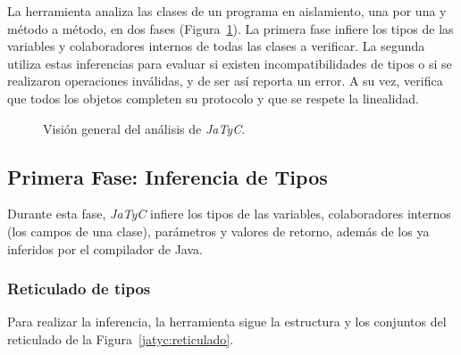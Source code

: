 La herramienta analiza las clases de un programa en aislamiento, una por una y método a método, en dos fases (Figura~\ref{fig:jatyc:pipeline}). La primera fase infiere los tipos de las variables y colaboradores internos de todas las clases a verificar. La segunda utiliza estas inferencias para evaluar si existen incompatibilidades de tipos o si se realizaron operaciones inválidas, y de ser así reporta un error. A su vez, verifica que todos los objetos completen su protocolo y que se respete la linealidad.

\begin{figure}[htbp]
    \centering
    \caption{Visión general del análisis de \textit{JaTyC}.}
    \label{fig:jatyc:pipeline}
\end{figure}

\subsection{Primera Fase: Inferencia de Tipos}

Durante esta fase, \textit{JaTyC} infiere los tipos de las variables, colaboradores internos (los campos de una clase), parámetros y valores de retorno, además de los ya inferidos por el compilador de Java.

\subsubsection{Reticulado de tipos}

Para realizar la inferencia, la herramienta sigue la estructura y los conjuntos del reticulado de la Figura~\ref{jatyc:reticulado}.

